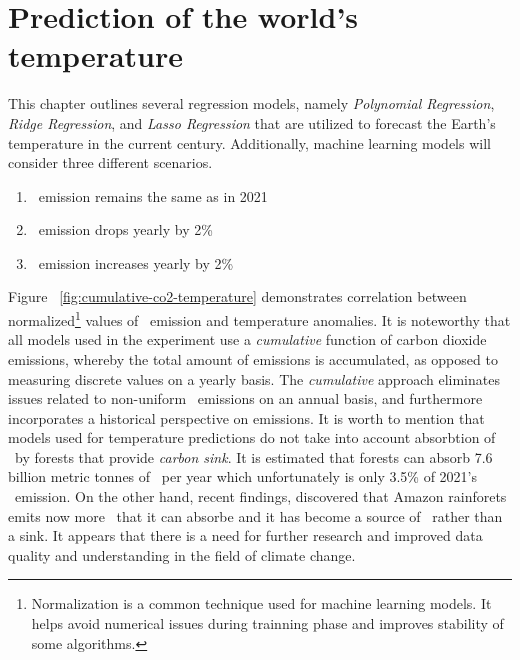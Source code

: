 \chapter{Prediction of the world's temperature}
\label{chap:two}

This chapter outlines several regression models, namely \textit{Polynomial Regression}, \textit{Ridge Regression}, and \textit{Lasso Regression} that are utilized to forecast the Earth's temperature in the current century. Additionally, machine learning models will consider three different scenarios.
\begin{enumerate}
  \item \coo\ emission remains the same as in 2021
  \item \coo\ emission drops yearly by 2\%
  \item \coo\ emission increases yearly by 2\%
\end{enumerate}
Figure ~\ref{fig:cumulative-co2-temperature} demonstrates correlation between normalized\footnote{Normalization is a common technique used for machine learning models. It helps avoid numerical issues during trainning phase and improves stability of some algorithms. } values of \coo\ emission and temperature anomalies.
It is noteworthy that all models used in the experiment use a \textit{cumulative} function of carbon dioxide emissions, whereby the total amount of emissions is accumulated, as opposed to measuring discrete values on a yearly basis. 
The \textit{cumulative} approach eliminates issues related to non-uniform \coo\ emissions on an annual basis, and furthermore incorporates a historical perspective on emissions.
It is worth to mention that models used for temperature predictions do not take into account absorbtion of \coo\ by forests that provide \textit{carbon sink}. It is estimated that forests can absorb 7.6 billion metric tonnes of \coo\ per year\cite{forest-absorbs} which unfortunately is only 3.5\% of 2021's \coo\ emission.
On the other hand, recent findings\cite{forest-emits}, discovered that Amazon rainforets emits now more \coo\ that it can absorbe and it has become a source of \coo\, rather than a sink. It appears that there is a need for further research and improved data quality and understanding in the field of climate change. 

